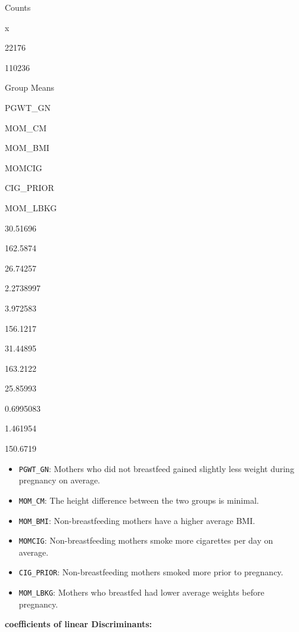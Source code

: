 \documentclass[
]{article}
\newenvironment{Shaded}{\begin{snugshade}}{\end{snugshade}}
\newcommand{\AttributeTok}[1]{\textcolor[rgb]{0.13,0.29,0.53}{#1}}
\newcommand{\FunctionTok}[1]{\textcolor[rgb]{0.13,0.29,0.53}{\textbf{#1}}}
\newcommand{\NormalTok}[1]{#1}
\newcommand{\SpecialCharTok}[1]{\textcolor[rgb]{0.81,0.36,0.00}{\textbf{#1}}}
\newcommand{\StringTok}[1]{\textcolor[rgb]{0.31,0.60,0.02}{#1}}
\providecommand{\tightlist}{%
  \setlength{\itemsep}{0pt}\setlength{\parskip}{0pt}}
\begin{document}
Counts

x

22176

110236

\begin{Shaded}
\end{Shaded}

Group Means

PGWT\_GN

MOM\_CM

MOM\_BMI

MOMCIG

CIG\_PRIOR

MOM\_LBKG

30.51696

162.5874

26.74257

2.2738997

3.972583

156.1217

31.44895

163.2122

25.85993

0.6995083

1.461954

150.6719

\begin{itemize}
\tightlist
\item
  \texttt{PGWT\_GN}: Mothers who did not breastfeed gained slightly less
  weight during pregnancy on average.
\item
  \texttt{MOM\_CM}: The height difference between the two groups is
  minimal.
\item
  \texttt{MOM\_BMI}: Non-breastfeeding mothers have a higher average
  BMI.
\item
  \texttt{MOMCIG}: Non-breastfeeding mothers smoke more cigarettes per
  day on average.
\item
  \texttt{CIG\_PRIOR}: Non-breastfeeding mothers smoked more prior to
  pregnancy.
\item
  \texttt{MOM\_LBKG}: Mothers who breastfed had lower average weights
  before pregnancy.
\end{itemize}

\textbf{coefficients of linear Discriminants:}\\
\end{document}
